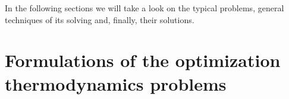\documentclass[epjST]{svjour}
\begin{document}
In the following sections we will take a look on the typical problems, general techniques of its solving and, finally, their solutions.

\section{Formulations of the optimization thermodynamics problems}



%
%
\end{document}

